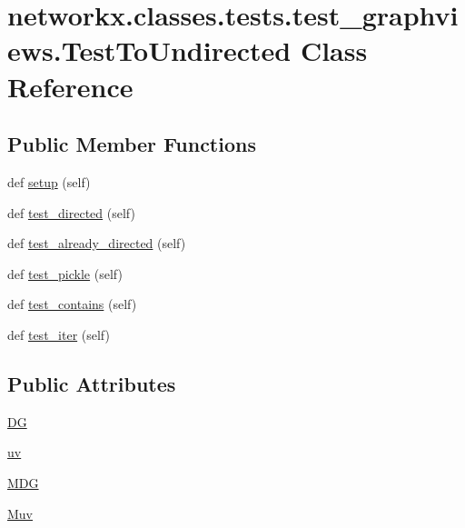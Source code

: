 \hypertarget{classnetworkx_1_1classes_1_1tests_1_1test__graphviews_1_1TestToUndirected}{}\section{networkx.\+classes.\+tests.\+test\+\_\+graphviews.\+Test\+To\+Undirected Class Reference}
\label{classnetworkx_1_1classes_1_1tests_1_1test__graphviews_1_1TestToUndirected}
\subsection*{Public Member Functions}
\begin{DoxyCompactItemize}
\item 
def \hyperlink{classnetworkx_1_1classes_1_1tests_1_1test__graphviews_1_1TestToUndirected_a3dd19e04150e981fc58db402b3353c85}{setup} (self)
\item 
def \hyperlink{classnetworkx_1_1classes_1_1tests_1_1test__graphviews_1_1TestToUndirected_af736191c2c466ce0c48d62e9016737bc}{test\+\_\+directed} (self)
\item 
def \hyperlink{classnetworkx_1_1classes_1_1tests_1_1test__graphviews_1_1TestToUndirected_ab4f7cd084ea65eb38fb0da5de411a95b}{test\+\_\+already\+\_\+directed} (self)
\item 
def \hyperlink{classnetworkx_1_1classes_1_1tests_1_1test__graphviews_1_1TestToUndirected_ac989e78fc24184f76f47dfca81b050e7}{test\+\_\+pickle} (self)
\item 
def \hyperlink{classnetworkx_1_1classes_1_1tests_1_1test__graphviews_1_1TestToUndirected_a06bf5f33549cf84f8f84afca2d0ce178}{test\+\_\+contains} (self)
\item 
def \hyperlink{classnetworkx_1_1classes_1_1tests_1_1test__graphviews_1_1TestToUndirected_a4b628051ca9737d5799bc79e5f377b4c}{test\+\_\+iter} (self)
\end{DoxyCompactItemize}
\subsection*{Public Attributes}
\begin{DoxyCompactItemize}
\item 
\hyperlink{classnetworkx_1_1classes_1_1tests_1_1test__graphviews_1_1TestToUndirected_a36217fe13958ba0116fcbf9201f91350}{DG}
\item 
\hyperlink{classnetworkx_1_1classes_1_1tests_1_1test__graphviews_1_1TestToUndirected_a8b6423f64728de8ef817546b94fede79}{uv}
\item 
\hyperlink{classnetworkx_1_1classes_1_1tests_1_1test__graphviews_1_1TestToUndirected_a1a5c9aafcdb70aeb60e5dc28f6ef3293}{M\+DG}
\item 
\hyperlink{classnetworkx_1_1classes_1_1tests_1_1test__graphviews_1_1TestToUndirected_a6f181f840e54ab812af09418fb0f2093}{Muv}
\end{DoxyCompactItemize}


